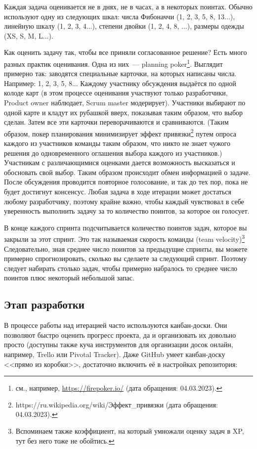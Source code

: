 \documentclass{../../text-style}
\begin{document}
Каждая задача оценивается не в днях, не в часах, а в некоторых поинтах. Обычно используют одну из следующих шкал: числа Фибоначчи (1, 2, 3, 5, 8, 13...), линейную шкалу (1, 2, 3, 4...), степени двойки (1, 2, 4, 8, ...), размеры одежды (XS, S, M, L...).

Как оценить задачу так, чтобы все приняли согласованное решение? Есть много разных практик оценивания. Одна из них~--- planning poker\footnote{см., например, \url{https://firepoker.io/} (дата обращения: 04.03.2023).}. Выглядит примерно так: заводятся специальные карточки, на которых написаны числа. Например: 1, 2, 3, 5, 8... Каждому участнику обсуждения выдаётся по одной колоде карт (в этом процессе оценивания участвуют только разработчики, Product owner наблюдает, Scrum master модерирует). Участники выбирают по одной карте и кладут их рубашкой вверх, показывая таким образом, что выбор сделан. Затем все эти карточки переворачиваются и сравниваются. (Таким образом, покер планирования минимизирует эффект привязки\footnote{https://ru.wikipedia.org/wiki/Эффект\_привязки (дата обращения: 04.03.2023).} путем опроса каждого из участников команды таким образом, что никто не знает чужого решения до одновременного оглашения выбора каждого из участников.) Участникам с различающимися оценками дается возможность высказаться и обосновать свой выбор. Таким образом происходит обмен информацией о задаче. После обсуждения проводится повторное голосование, и так до тех пор, пока не будет достигнут консенсус. Любая задача в ходе итерации может достаться любому разработчику, поэтому крайне важно, чтобы каждый чувствовал в себе уверенность выполнить задачу за то количество поинтов, за которое он голосует.

В конце каждого спринта подсчитывается количество поинтов задач, которое вы закрыли за этот спринт. Это так называемая скорость команды (team velocity)\footnote{Вспоминаем также коэффициент, на который умножали оценку задач в XP, тут без него тоже не обойтись.} Следовательно, зная среднее число поинтов за предыдущие спринты, вы можете примерно спрогнозировать, сколько вы сделаете за следующий спринт. Поэтому следует набирать столько задач, чтобы примерно набралось то среднее число поинтов плюс некоторый небольшой запас.

\subsection{Этап разработки}

В процессе работы над итерацией часто используются канбан-доски. Они  позволяют быстро оценить прогресс проекта, да и организовать их довольно просто (доступны также куча инструментов для организации досок онлайн, например, Trello или Pivotal Tracker). Даже GitHub умеет канбан-доску <<прямо из коробки>>, достаточно включить её в настройках репозитория:
\end{document}
